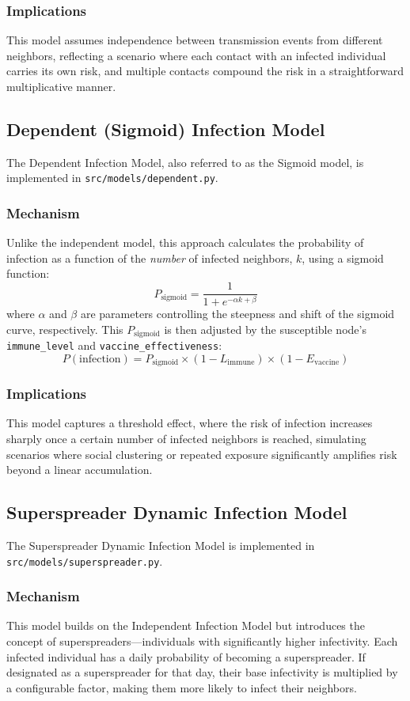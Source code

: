 \documentclass[12pt]{article}
\begin{document}
\subsubsection{Implications}
This model assumes independence between transmission events from different neighbors, reflecting a scenario where each contact with an infected individual carries its own risk, and multiple contacts compound the risk in a straightforward multiplicative manner.

\subsection{Dependent (Sigmoid) Infection Model}
The Dependent Infection Model, also referred to as the Sigmoid model, is implemented in \texttt{src/models/dependent.py}.
\subsubsection{Mechanism}
Unlike the independent model, this approach calculates the probability of infection as a function of the \textit{number} of infected neighbors, $k$, using a sigmoid function:
\[ P_{\text{sigmoid}} = \frac{1}{1 + e^{-\alpha k + \beta}} \]
where $\alpha$ and $\beta$ are parameters controlling the steepness and shift of the sigmoid curve, respectively. This $P_{\text{sigmoid}}$ is then adjusted by the susceptible node's \texttt{immune\_level} and \texttt{vaccine\_ef\-fec\-tive\-ness}:
\[ P(\text{infection}) = P_{\text{sigmoid}} \times (1 - L_{\text{immune}}) \times (1 - E_{\text{vaccine}}) \]
\subsubsection{Implications}
This model captures a threshold effect, where the risk of infection increases sharply once a certain number of infected neighbors is reached, simulating scenarios where social clustering or repeated exposure significantly amplifies risk beyond a linear accumulation.

\subsection{Superspreader Dynamic Infection Model}
The Superspreader Dynamic Infection Model is implemented in \texttt{src/models/super\-spreader.py}.
\subsubsection{Mechanism}
This model builds on the Independent Infection Model but introduces the concept of superspreaders—individuals with significantly higher infectivity. Each infected individual has a daily probability of becoming a superspreader. If designated as a superspreader for that day, their base infectivity is multiplied by a configurable factor, making them more likely to infect their neighbors.
\end{document}
